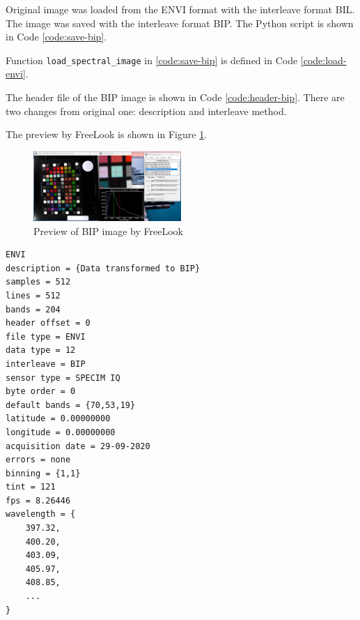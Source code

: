 Original image was loaded from the ENVI format with the interleave format BIL. The image was saved with the interleave format BIP. The Python script is shown in Code \ref{code:save-bip}.

Function \texttt{load\_spectral\_image} in \ref{code:save-bip} is defined in Code \ref{code:load-envi}.

The header file of the BIP image is shown in Code \ref{code:header-bip}. There are two changes from original one: description and interleave method.

The preview by FreeLook is shown in Figure \ref{fig:bip-preview}.

\begin{figure}[H]
  \centering
  \caption{Preview of BIP image by FreeLook}
  \label{fig:bip-preview}
  \includegraphics[width=0.5\textwidth]{./fig-task4/bip_preview.png}
\end{figure}

\begin{lstlisting}[caption=Header file of BIP, label={code:header-bip}]
ENVI
description = {Data transformed to BIP}
samples = 512
lines = 512
bands = 204
header offset = 0
file type = ENVI
data type = 12
interleave = BIP
sensor type = SPECIM IQ
byte order = 0
default bands = {70,53,19}
latitude = 0.00000000
longitude = 0.00000000
acquisition date = 29-09-2020
errors = none
binning = {1,1}
tint = 121
fps = 8.26446
wavelength = {
    397.32,
    400.20,
    403.09,
    405.97,
    408.85,
    ...
}
\end{lstlisting}
